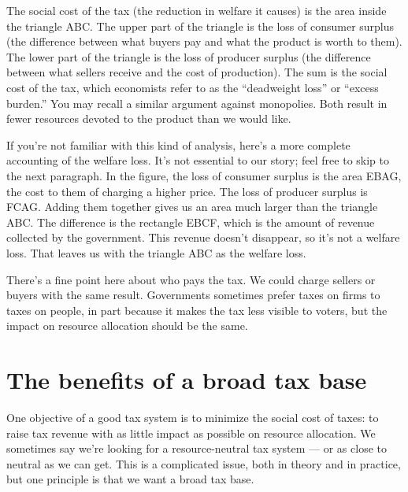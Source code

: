 The social cost of the tax (the reduction in welfare it causes)
is the area inside the triangle ABC.
The upper part of the triangle is the loss of consumer surplus
(the difference between what buyers pay and what the product is worth to them).
The lower part of the triangle is the loss of producer surplus
(the difference between what sellers receive and the cost of production).
The sum is the social cost of the tax,
which economists refer to as the ``deadweight loss'' or ``excess burden.''
You may recall a similar argument against monopolies.
Both result in fewer resources devoted to the product
than we would like.

If you're not familiar with this kind of analysis,
here's a more complete accounting of the welfare loss.
It's not essential to our story; feel free to skip to the next paragraph.
In the figure, the loss of consumer surplus is the area EBAG,
the cost to them of charging a higher price.
The loss of producer surplus is FCAG.
Adding them together gives us an area much larger than the triangle ABC.
The difference is the rectangle EBCF,
which is the amount of revenue collected by the government.
This revenue doesn't disappear, so it's not a welfare loss.
That leaves us with the triangle ABC as the welfare loss.

There's a fine point here about who pays the tax.
We could charge sellers or buyers with the same result.
Governments sometimes prefer taxes on firms to taxes on
people, in part because it makes the tax less visible to voters,
but the impact on resource allocation should be the same.


\section{The benefits of a broad tax base}


One objective of a good tax system is to minimize the social cost
of taxes:  to raise tax revenue with as little impact as possible
on resource allocation.
We sometimes say we're looking for a resource-neutral tax system ---
or as close to neutral as we can get.
This is a
complicated issue, both in theory and in practice,
but one principle is that we want a broad tax base.


